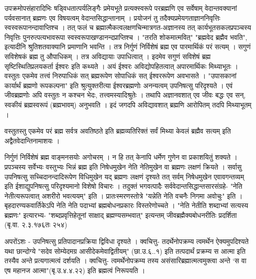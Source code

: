 {उपक्रमोपसंहारादिभिः षड्विधतात्पर्यलिङ्गैः प्रमेयभूते प्रत्यक्स्वरूपे परब्रह्मणि एव सर्वेषाम् वेदान्तवक्यानां पर्यवसानात् ब्रह्मणः एव विषयत्वम् वेदान्तसिद्धान्तानाम् । प्रयोजनं तु तदैक्यप्रमेयगताज्ञाननिवृत्तिः स्वस्वरूपानन्दावाप्तिश्च । तत् फलं च ब्रह्मात्मैकत्वलक्षणचिन्मात्रगत-अज्ञानस्य तत् कार्यभूतसकलप्रपञ्चस्य निवृत्तिः पुनरुत्पत्यभावरूपा स्वस्वरूपाखण्डानन्दप्राप्तिश्च । "तरति शोकमात्मवित्" "ब्रह्मवेद ब्रह्मैव भवति", इत्यादीनि श्रुतिशतवाक्यानि प्रमाणानि भवन्ति । तत्र निर्गुणं निर्विशेषं ब्रह्म एव पारमार्थिकं परं सत्यम् । सगुणं सविशेषकं ब्रह्म तु औपाधिकम् । तत्र अविद्यायाः उपाधित्वात् । इदमेव सगुणं सविशेषं ब्रह्म सृष्टिस्थितिप्रलयकर्ता ईश्वरः इति कथ्यते । अयं ईश्वरः अविद्योपहितत्वात् अपारमार्थिकः मिथ्याभूतः । वस्तुतः एकमेव तत्त्वं निरुपाधिकं सत् ब्रह्मरूपेण सोपाधिकं सत् ईश्वररूपेण अवभासते । "उपासकानां कार्यार्थं ब्रह्मणो रूपकल्पना" इति श्रुत्युक्तरीत्या ईश्वरब्रह्मणोः अनन्यत्वम् उपनिषत्सु परिदृश्यते । एवं जीवब्रह्मणोः अपि वस्तुतः न कश्चन भेदः, तत्त्वमस्यादिश्रुतेः । तथापि अज्ञानवशात् एव जीवः बद्धः एव सन्, स्वकीयं ब्रह्मस्वरूपं (ब्रह्मभावम्) अनुभवति । इदं जगदपि अविद्यावशात् ब्रह्मणि आरोपितम् तदपि मिथ्याभूतम् ।

वस्तुतस्तु एकमेव परं ब्रह्म सर्वत्र अवतिष्ठते इति ब्रह्मव्यतिरिक्तं सर्वं मिथ्या केवलं ब्रह्मैव सत्यम् इति अद्वैतवेदान्तिनामाशयः ।

निर्गुणं निर्विशेषं ब्रह्म वाङ्मनसयोः अगोचरम् । न हि तत् केनापि धर्मेण गुणेन वा प्रकाशयितुं शक्यते । प्रपञ्चस्य सर्वेभ्यः वस्तुभ्यः भिन्नं ब्रह्म इति निषेधमुखेन नेति नेतिमुखेन वा ब्रह्मणः लक्षणं क्रियते । सर्वासु उपनिषत्सु सच्चिदानन्दादिरूपेण विधिमुखेन यद् ब्रह्मणः लक्षणं दृश्यते तत् सर्वम् निषेधमुखेन एवावगन्तव्यम् इति ईशाद्युपनिषत्सु परिदृश्यमानो विशेषो विचारः । तदुक्तं भगवत्पादैः सर्ववेदान्तसिद्धान्तसारसंग्रहे- "नेति नेतीत्यरूपत्वात् अशरीरो भवत्ययम्" इति । प्रातःस्मरणस्तोत्रे "यन्नेति नेति वचनैः निगमा अवोचुः" इति । बृहदारण्यकवार्तिकेऽपि नेति नेति पदाभ्यां ब्रह्मबोधनप्रकारः विस्तरेणोच्चते । "नेति नेतीति शब्दाभ्यां सत्यस्य ब्रह्मणः" इत्यारभ्य- "शब्दप्रवृत्तिहेतूनां साक्षाद् ब्रह्मण्यसम्भवात्" इत्यन्तम् जीवब्रह्मैक्यबोधनरीतिः प्रदर्शिता (बृ.वा. २.३.१७६तः २५४)

अपरोंऽशः - उपनिषत्सु प्रतिपादानप्रक्रिया द्विविधा दृश्यते । क्वचित्तु- तदर्थेनोपक्रम्य त्वमर्थेन ऐक्यमुपदिश्यते यथा छान्दोग्ये "सदेव सोम्येदमग्र आसीदेकमेवाद्वितीयम्" (छा.उ.६..१) इति तत्पदार्थं प्रक्रम्य स आत्मा इति तस्यैव अन्ते प्रत्यगात्मत्वं दर्शयति । क्वचित्तु- त्वमर्थेनोपक्रम्य तस्य असंसारिब्रह्मात्मत्वमुक्त्वा अन्ते ‘स वा एष महानज आत्मा"(बृ.उ.४.४.२२) इति ब्रह्मत्वं निरूपयति ।

}

